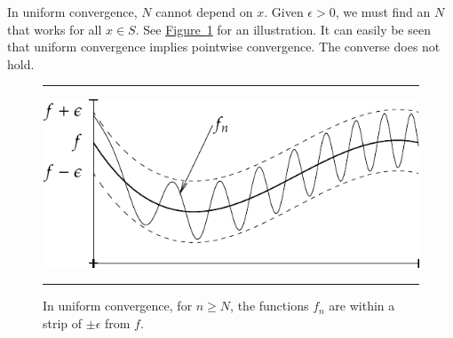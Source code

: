 \documentclass[12pt,openany]{book}
\theoremstyle{plain}
\theoremstyle{remark}
\theoremstyle{definition}
\newenvironment{myfig}{%
\begin{figure}[h!t]
\noindent\rule{\textwidth}{0.5pt}\vspace{12pt}\par\centering}%
{\par\noindent\rule{\textwidth}{0.5pt}
\end{figure}}
\theoremstyle{exercise}
\theoremstyle{example}
\newcommand{\figureref}[1]{\hyperref[#1]{Figure~\ref*{#1}}}
\begin{document}
In uniform convergence, $N$ cannot depend on $x$.  Given $\epsilon > 0$,
we must find an $N$ that works for all $x \in S$.  See
\figureref{fig:uniformconv} for an illustration.
It can easily be seen that uniform convergence implies pointwise
convergence.  The converse does not hold.
\begin{myfig}
\includegraphics{figures/uniformconv}
\caption{In uniform convergence,
for $n \geq N$,
the functions $f_n$ are within a strip of $\pm\epsilon$ from $f$.%
\label{fig:uniformconv}}
\end{myfig}
\end{document}

